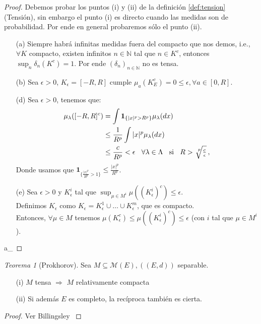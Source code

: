 \documentclass[letterpaper,11pt]{article} %
\def\espacio{\hspace{.25cm}\,}
\theoremstyle{defbreak}
\theoremstyle{propbreak}
\theoremstyle{remark}
\theoremstyle{break}
\newtheorem{theorem}{Teorema}[subsection]
\def\N{\mathbb{N}}
\def\gris{\color{mygray}}
\def\negro{\color{black}}
\def\findem{\null\hfill\color{white}a\color{black}_\square}
\begin{document}
\begin{proof}
\gris
Debemos probar los puntos (i) y (ii) de la definición \ref{def:tension} (Tensión), sin embargo el punto (i) es directo cuando las medidas son de probabilidad. Por ende en general probaremos sólo el punto (ii).
\begin{enumerate}
    \item[(a)] Siempre habrá infinitas medidas fuera del compacto que nos demos, i.e., $\forall K$ compacto, existen infinitos $n\in\N$ tal que $n\in K^c$, entonces $\displaystyle\sup_n\delta_n(K^c)=1$. Por ende $(\delta_n)_{n\in\mathbb{N}}$ no es tensa.
    \item[(b)] %
    Sea $\epsilon>0$, $K_\epsilon=[-R,R]$ cumple $\mu_a(K_E^c)=0\leq\epsilon, \forall a\in[0,R]$.
    \item[(d)] Sea $\epsilon>0$, tenemos que: %
    \begin{alignat*}{2}
        \mu_\lambda([-R,R]^c) & = \int\mathbf{1}_{\{|x|^p>R^p\}}\mu_\lambda(dx) \\
         & \leq \frac{1}{R^p}\int |x|^p\mu_\lambda(dx)\\
         & \leq \frac{c}{R^p} < \epsilon \espacio \forall \lambda \in \Lambda \espacio \text{si} \espacio R>\sqrt[\leftroot{-3}\uproot{3}p]{\tfrac{c}{\epsilon}}\, , %
    \end{alignat*}
    Donde usamos que $\mathbf{1}_{\{\frac{|x|^p}{R^p}>1\}}\leq\frac{|x|^p}{R^p}$.
    \item[(e)] Sea $\epsilon>0$ y $K_\epsilon^i$ tal que $\displaystyle\sup_{\mu\in M^i}\mu((K^i_\epsilon)^c)\leq\epsilon$.
    \\ Definimos $K_\epsilon$ como $K_\epsilon=K^1_\epsilon\cup\dots\cup K^m_\epsilon$, que es compacto.
    \\ Entonces, $\forall \mu\in M$ tenemos
    $ \mu(K_\epsilon^c)\leq\mu((K^i_\epsilon)^c)\leq\epsilon$ (con $i$ tal que $\mu\in M^i$).
\end{enumerate}
\findem \negro
\end{proof}

\begin{theorem}[Prokhorov]
\label{theorem:pro}
Sea $M\subseteq\mathcal{M}(E), ((E,d))$ separable.
\begin{itemize}
    \item[(i)] $M$ tensa $\Longrightarrow$ $M$ relativamente compacta
    \item[(ii)] Si además $E$ es completo, la recíproca también es cierta.
\end{itemize}
\end{theorem}
\begin{proof}
\gris Ver Billingsley \cite{billing} \negro
\end{proof}
\end{document}
